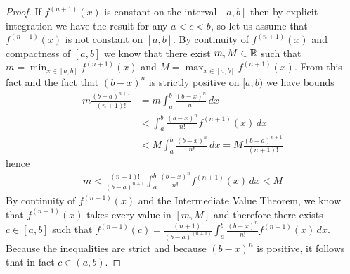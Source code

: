 \begin{proof}
If $f^{(n+1)}(x)$ is constant on the interval $[a,b]$ then by explicit
integration we have the result for any $a < c < b$, so let us assume
that $f^{(n+1)}(x)$ is not constant on $[a,b]$.
By continuity of $f^{(n+1)}(x)$ and compactness of $[a,b]$ we know
that there exist $m, M \in \mathbb{R}$ such that $m = \min_{x \in [a,b]}
f^{(n+1)}(x)$ and $M = \max_{x \in [a,b]}
f^{(n+1)}(x)$.
From this fact and the fact that $(b -x)^n$ is strictly positive on
$[a,b)$ we have bounds
\begin{align*}
m\frac{(b-a)^{n+1}}{(n+1)!} &= m \int_a^b
\frac{(b-x)^n}{n!} \, dx \\
&< \int_a^b
\frac{(b-x)^n}{n!} f^{(n+1)}(x) \, dx \\
&< M \int_a^b
\frac{(b-x)^n}{n!} \, dx = M\frac{(b-a)^{n+1}}{(n+1)!} 
\end{align*}
hence 
\begin{align*}
m < \frac {(n+1)!} {(b-a)^{n+1}}\int_a^b
\frac{(b-x)^n}{n!} f^{(n+1)}(x) \, dx < M
\end{align*}
By continuity of $f^{(n+1)}(x)$ and the Intermediate Value Theorem, we know that $f^{(n+1)}(x)$
takes every value in $[m,M]$ and therefore there exists $c \in [a,b]$
such that $f^{(n+1)}(c) = \frac {(n+1)!} {(b-a)^{(n+1)}}\int_a^b
\frac{(b-x)^n}{n!} f^{(n+1)}(x) \, dx$.  Because the inequalities are
strict and because $(b-x)^n$ is positive, it follows that in fact $c
\in (a,b)$.
\end{proof}

